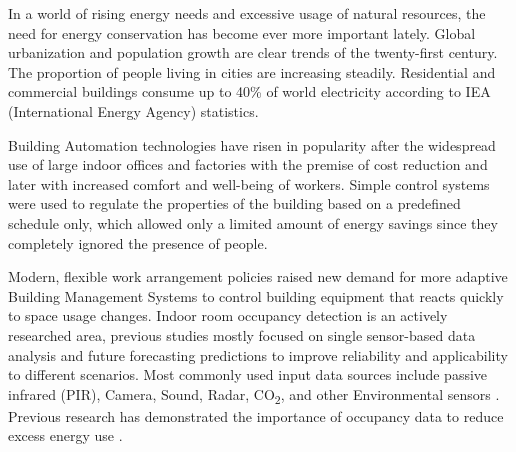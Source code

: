 

In a world of rising energy needs and excessive usage of natural resources, the need for energy conservation has become ever more important lately. Global urbanization and population growth are clear trends of the twenty-first century. The proportion of people living in cities are increasing steadily. Residential and commercial buildings consume up to 40\% of world electricity \cite{perez2008_energyBuilding} according to IEA (International Energy Agency) statistics.

\begin{sloppypar}
Building Automation technologies have risen in popularity after the widespread use of large indoor offices and factories with the premise of cost reduction and later with increased comfort and well-being of workers. Simple control systems were used to regulate the properties of the building based on a predefined schedule only, which allowed only a limited amount of energy savings since they completely ignored the presence of people.
\end{sloppypar}

Modern, flexible work arrangement policies raised new demand for more adaptive Building Management Systems to control building equipment that reacts quickly to space usage changes. Indoor room occupancy detection is an actively researched area, previous studies mostly focused on single sensor-based data analysis and future forecasting predictions to improve reliability and applicability to different scenarios. Most commonly used input data sources include passive infrared (PIR), Camera, Sound, Radar, CO\textsubscript{2}, and other Environmental sensors \cite{build_occ_det_tech_review}. Previous research has demonstrated the importance of occupancy data to reduce excess energy use \cite{ZHANG2018build_energy_occ, NGUYEN2013build_energy_occ}.

